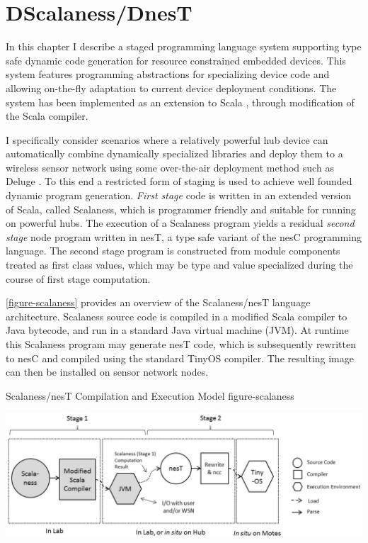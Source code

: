
\chapter{DScalaness/DnesT}
\label{chapter-dscalaness-dnest}


In this chapter I describe a staged programming language system supporting type safe dynamic
code generation for resource constrained embedded devices. This system features programming
abstractions for specializing device code and allowing on-the-fly adaptation to current device
deployment conditions. The system has been implemented as an extension to Scala \cite{PiS2},
through modification of the Scala compiler.

I specifically consider scenarios where a relatively powerful hub device can automatically
combine dynamically specialized libraries and deploy them to a wireless sensor network using
some over-the-air deployment method such as Deluge \cite{deluge04}. To this end a restricted
form of staging \cite{Taha-MetaML,DBLP:conf/icess/Taha04,289140} is used to achieve well founded
dynamic program generation. \emph{First stage} code is written in an extended version of Scala,
called Scalaness, which is programmer friendly and suitable for running on powerful hubs. The
execution of a Scalaness program yields a residual \emph{second stage} node program written in
nesT, a type safe variant of the nesC programming language. The second stage program is
constructed from module components treated as first class values, which may be type and value
specialized during the course of first stage computation.

\autoref{figure-scalaness} provides an overview of the Scalaness/nesT language architecture.
Scalaness source code is compiled in a modified Scala compiler to Java bytecode, and run in a
standard Java virtual machine (JVM). At runtime this Scalaness program may generate nesT code,
which is subsequently rewritten to nesC and compiled using the standard TinyOS compiler. The
resulting image can then be installed on sensor network nodes.

\begin{fpfig*}[t]
  {Scalaness/nesT Compilation and Execution Model}
  {figure-scalaness}
  \begin{center}
    \includegraphics[scale=.54]{Figures/scalaness.eps}
  \end{center}
\end{fpfig*}

